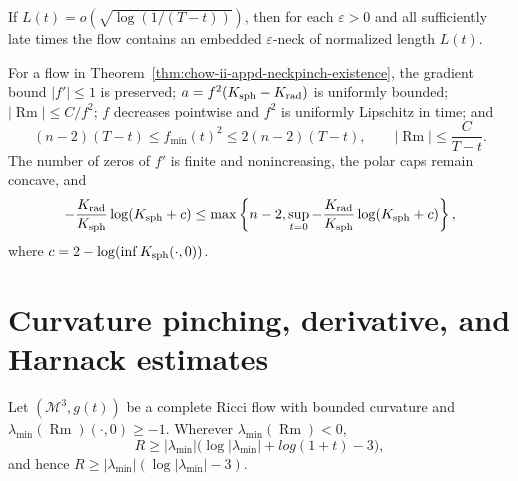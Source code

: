 \begin{remark}
\label{rem:chow-ii-appd-growing-neck-length}

If $L(t)=o(\sqrt{\log(1/(T-t))})$, then for each $\varepsilon>0$ and all
sufficiently late times the flow contains an embedded $\varepsilon$-neck of
normalized length $L(t)$.
\end{remark}

\begin{proposition}
\label{prop:chow-ii-appd-neckpinch-estimates}


For a flow in Theorem~\ref{thm:chow-ii-appd-neckpinch-existence}, the gradient
bound $|f'|\leq1$ is preserved; $a=f^2(K_{\rm sph}-K_{\rm rad})$ is uniformly
bounded; $|\operatorname{Rm}|\leq C/f^2$; $f$ decreases pointwise and $f^2$
is uniformly Lipschitz in time; and
\[
 (n-2)(T-t)\leq f_{\min}(t)^2\leq2(n-2)(T-t),\qquad
 |\operatorname{Rm}|\leq\frac C{T-t}.
\]
The number of zeros of $f'$ is finite and nonincreasing, the polar caps remain
concave, and
\[
 -\frac{K_{\rm rad}}{K_{\rm sph}}\log(K_{\rm sph}+c)
 \leq\max\left\{n-2,
 \sup_{t=0}-\frac{K_{\rm rad}}{K_{\rm sph}}
 \log(K_{\rm sph}+c)\right\},
\]
where $c=2-\log(\inf K_{\rm sph}(\cdot,0))$.
\end{proposition}

\section{Curvature pinching, derivative, and Harnack estimates}

\begin{theorem}
\label{thm:chow-ii-appd-hamilton-ivey}

Let $(\mathcal M^3,g(t))$ be a complete Ricci flow with bounded curvature and
$\lambda_{\min}(\operatorname{Rm})(\cdot,0)\geq-1$. Wherever
$\lambda_{\min}(\operatorname{Rm})<0$,
\[
 R\geq|\lambda_{\min}|\bigl(\log|\lambda_{\min}|+log(1+t)-3\bigr),
\]
and hence $R\geq|\lambda_{\min}|(\log|\lambda_{\min}|-3)$.
\end{theorem}

